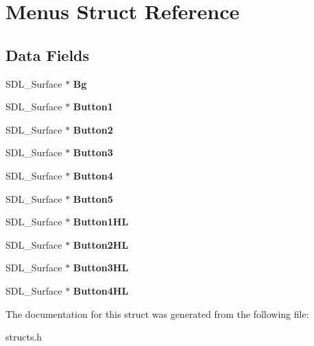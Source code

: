 \hypertarget{structMenus}{}\section{Menus Struct Reference}
\label{structMenus}
\subsection*{Data Fields}
\begin{DoxyCompactItemize}
\item 
\mbox{\label{structMenus_a9182a9129b41b10ffba5034c2720f9f9}} 
S\+D\+L\+\_\+\+Surface $\ast$ {\bfseries Bg}
\item 
\mbox{\label{structMenus_ab75bbc812a9767dbd9d50f0687bff2a4}} 
S\+D\+L\+\_\+\+Surface $\ast$ {\bfseries Button1}
\item 
\mbox{\label{structMenus_a5e3669e7568dd827a93349ce20b65409}} 
S\+D\+L\+\_\+\+Surface $\ast$ {\bfseries Button2}
\item 
\mbox{\label{structMenus_a90c5cc8c08f708e382e0aeae3ff6d66f}} 
S\+D\+L\+\_\+\+Surface $\ast$ {\bfseries Button3}
\item 
\mbox{\label{structMenus_ac7183390a8e66f77acdfdb418d31802b}} 
S\+D\+L\+\_\+\+Surface $\ast$ {\bfseries Button4}
\item 
\mbox{\label{structMenus_a662114e0cfa9b2c6fac62773f21e0781}} 
S\+D\+L\+\_\+\+Surface $\ast$ {\bfseries Button5}
\item 
\mbox{\label{structMenus_a726cdc88170cda15c4b9de52758689c8}} 
S\+D\+L\+\_\+\+Surface $\ast$ {\bfseries Button1\+HL}
\item 
\mbox{\label{structMenus_a4214fd9d116c072ec348f077069998f0}} 
S\+D\+L\+\_\+\+Surface $\ast$ {\bfseries Button2\+HL}
\item 
\mbox{\label{structMenus_a6b37c941850d5b9b29220a05e793f996}} 
S\+D\+L\+\_\+\+Surface $\ast$ {\bfseries Button3\+HL}
\item 
\mbox{\label{structMenus_aacd5e607f76d26bb7c3becf99dcb8b5a}} 
S\+D\+L\+\_\+\+Surface $\ast$ {\bfseries Button4\+HL}
\end{DoxyCompactItemize}


The documentation for this struct was generated from the following file\+:\begin{DoxyCompactItemize}
\item 
structs.\+h\end{DoxyCompactItemize}
